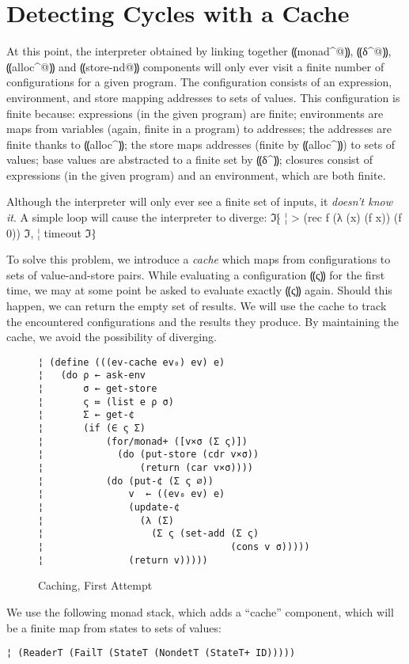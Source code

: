 \section{Detecting Cycles with a Cache}\label{s:cache}

At this point, the interpreter obtained by linking together ⸨monad^@⸩, ⸨δ^@⸩,
⸨alloc^@⸩ and ⸨store-nd@⸩ components will only ever visit a finite number of
configurations for a given program.  The configuration consists of an
expression, environment, and store mapping addresses to sets of values.  This
configuration is finite because: expressions (in the given program) are finite;
environments are maps from variables (again, finite in a program) to addresses;
the addresses are finite thanks to ⸨alloc^⸩; the store maps addresses (finite
by ⸨alloc^⸩) to sets of values; base values are abstracted to a finite set by
⸨δ^⸩; closures consist of expressions (in the given program) and an
environment, which are both finite.

Although the interpreter will only ever see a finite set of inputs, it
\emph{doesn't know it}.  A simple loop will cause the interpreter to diverge:
ℑ⁅
¦ > (rec f (λ (x) (f x)) (f 0))
ℑ,
¦ timeout
ℑ⁆

To solve this problem, we introduce a \emph{cache} which maps from
configurations to sets of value-and-store pairs. While evaluating a
configuration ⸨ς⸩ for the first time, we may at some point be asked to evaluate
exactly ⸨ς⸩ again. Should this happen, we can return the empty set of results.
We will use the cache to track the encountered configurations and the results
they produce.  By maintaining the cache, we avoid the possibility of diverging.

\begin{figure}
\begin{lstlisting}
¦ (define (((ev-cache ev₀) ev) e)
¦   (do ρ ← ask-env
¦       σ ← get-store
¦       ς ≔ (list e ρ σ)
¦       Σ ← get-¢
¦       (if (∈ ς Σ)
¦           (for/monad+ ([v×σ (Σ ς)])
¦             (do (put-store (cdr v×σ))
¦                 (return (car v×σ))))
¦           (do (put-¢ (Σ ς ∅))
¦               v  ← ((ev₀ ev) e)
¦               (update-¢
¦                 (λ (Σ) 
¦                   (Σ ς (set-add (Σ ς)
¦                                 (cons v σ)))))
¦               (return v)))))
\end{lstlisting}
\caption{Caching, First Attempt}
\label{f:ev-cache0}
\end{figure}

We use the following monad stack, which adds a ``cache'' component,
which will be a finite map from states to sets of values:
\begin{lstlisting}
¦ (ReaderT (FailT (StateT (NondetT (StateT+ ID)))))
\end{lstlisting}

